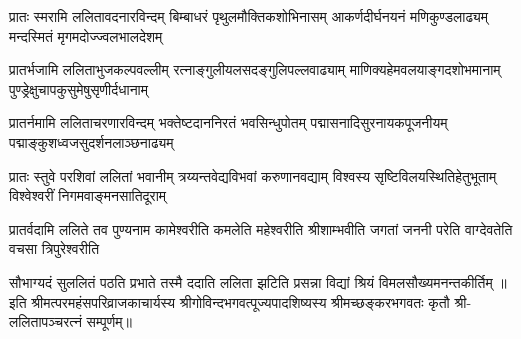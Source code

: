 
\fourlineindentedshloka
{प्रातः स्मरामि ललितावदनारविन्दम्}
{बिम्बाधरं पृथुलमौक्तिकशोभिनासम्}
{आकर्णदीर्घनयनं मणिकुण्डलाढ्यम्}
{मन्दस्मितं मृगमदोज्ज्वलभालदेशम्}

\fourlineindentedshloka
{प्रातर्भजामि ललिताभुजकल्पवल्लीम्}
{रत्नाङ्गुलीयलसदङ्गुलिपल्लवाढ्याम्}
{माणिक्यहेमवलयाङ्गदशोभमानाम्}
{पुण्ड्रेक्षुचापकुसुमेषुसृणीर्दधानाम्}

\fourlineindentedshloka
{प्रातर्नमामि ललिताचरणारविन्दम्}
{भक्तेष्टदाननिरतं भवसिन्धुपोतम्}
{पद्मासनादिसुरनायकपूजनीयम्}
{पद्माङ्कुशध्वजसुदर्शनलाञ्छनाढ्यम्}

\fourlineindentedshloka
{प्रातः स्तुवे परशिवां ललितां भवानीम्}
{त्रय्यन्तवेद्यविभवां करुणानवद्याम्}
{विश्वस्य सृष्टिविलयस्थितिहेतुभूताम्}
{विश्वेश्वरीं निगमवाङ्मनसातिदूराम्}

\fourlineindentedshloka
{प्रातर्वदामि ललिते तव पुण्यनाम}
{कामेश्वरीति कमलेति महेश्वरीति}
{श्रीशाम्भवीति जगतां जननी परेति}
{वाग्देवतेति वचसा त्रिपुरेश्वरीति}

{सौभाग्यदं सुललितं पठति प्रभाते}
{तस्मै ददाति ललिता झटिति प्रसन्ना}
{विद्यां श्रियं विमलसौख्यमनन्तकीर्तिम्}
॥इति श्रीमत्परमहंसपरिव्राजकाचार्यस्य श्रीगोविन्दभगवत्पूज्यपादशिष्यस्य 
श्रीमच्छङ्करभगवतः कृतौ  श्री-ललितापञ्चरत्नं सम्पूर्णम्॥